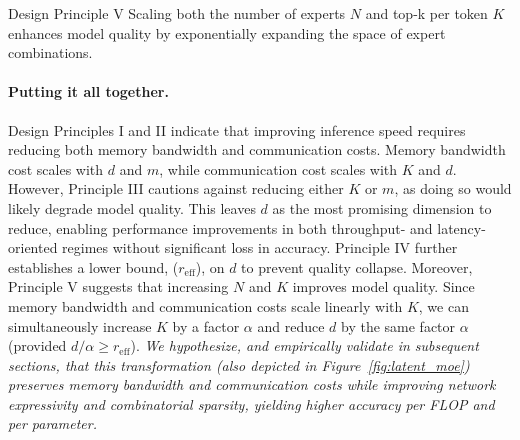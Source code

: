 \begin{notebox}{Design Principle V}
Scaling both the number of experts $N$ and top-k per token $K$ enhances model quality by exponentially expanding the space of expert combinations.
\end{notebox}

\paragraph{Putting it all together.} Design Principles I and II indicate that improving inference speed requires reducing both memory bandwidth and communication costs. Memory bandwidth cost scales with 
$d$ and $m$, while communication cost scales with $K$ and $d$. However, Principle III cautions against reducing either $K$ or $m$, as doing so would likely degrade model quality. This leaves $d$ as the most promising dimension to reduce, enabling performance improvements in both throughput- and latency-oriented regimes without significant loss in accuracy. Principle IV further establishes a lower bound, ($r_\mathrm{eff}$), on $d$ to prevent quality collapse. Moreover, Principle V suggests that increasing $N$ and $K$ improves model quality. Since memory bandwidth and communication costs scale linearly with $K$, we can simultaneously increase $K$ by a factor $\alpha$ and reduce $d$ by the same factor $\alpha$ (provided $d/\alpha \ge r_\mathrm{eff}$). \textcolor{green!50!black}{\textit{We hypothesize, and empirically validate in subsequent sections, that this transformation (also depicted in Figure~\ref{fig:latent_moe}) preserves memory bandwidth and communication costs while improving network expressivity and combinatorial sparsity, yielding higher accuracy per FLOP and per parameter.}}

